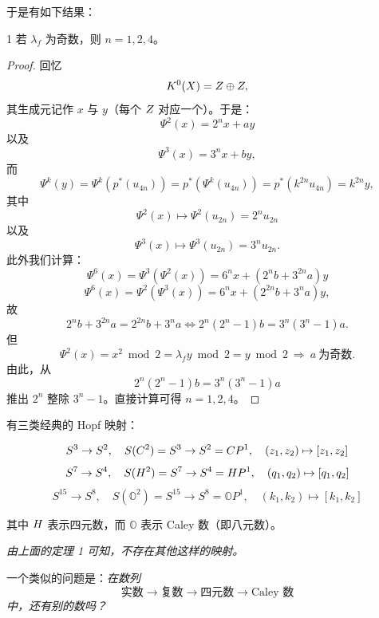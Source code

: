 
于是有如下结果：

\begin{thm}{1} 若 $\lambda_f$ 为奇数，则 $n=1,2,4$。 \end{thm}

\begin{proof}
回忆
\[  K^0(X)=Z\oplus Z, \]
其生成元记作 $x$ 与 $y$（每个 $Z$ 对应一个）。于是：
\[ \Psi^2(x)=2^n x+ay \]
以及
\[ \Psi^3(x)=3^n x+by, \]
而
\[ \Psi^k(y)=\Psi^k(p^*(u_{4n}))=p^*(\Psi^k(u_{4n}))=p^*(k^{2n}u_{4n})=k^{2n}y, \]
其中
\[ \Psi^2(x)\mapsto\Psi^2(u_{2n})=2^n u_{2n} \]
以及
\[ \Psi^3(x)\mapsto\Psi^3(u_{2n})=3^n u_{2n}. \]
此外我们计算：
\[ \Psi^6(x)=\Psi^3(\Psi^2(x))=6^n x+(2^n b+3^{2n}a)y \]
\[ \Psi^6(x)=\Psi^2(\Psi^3(x))=6^n x+(2^{2n}b+3^n a)y, \]
故
\[ 2^n b+3^{2n}a=2^{2n}b+3^n a\iff 2^n(2^n-1)b=3^n(3^n-1)a. \]
但
\[ \Psi^2(x)=x^2\bmod 2=\lambda_f y\bmod 2=y\bmod 2\ \Rightarrow\ a\ \text{为奇数}. \]
由此，从
\[ 2^n(2^n-1)b=3^n(3^n-1)a \]
推出 $2^n$ 整除 $3^n-1$。直接计算可得 $n=1,2,4$。
\end{proof}

有三类经典的 Hopf 映射：


\[ S^3\to S^2,\quad S(C^2)=S^3\to S^2=C P^1,\quad (z_1,z_2)\mapsto[z_1,z_2] \]
\[ S^7\to S^4,\quad S(H^2)=S^7\to S^4=H P^1,\quad (q_1,q_2)\mapsto[q_1,q_2] \]
\[ S^{15}\to S^8,\quad S(\mathbb{O}^2)=S^{15}\to S^8=\mathbb{O}P^1,\quad (k_1,k_2)\mapsto[k_1,k_2] \]

其中 $H$ 表示四元数，而 $\mathbb{O}$ 表示 Caley 数（即八元数）。

\emph{由上面的定理 1 可知，不存在其他这样的映射。}

一个类似的问题是：\emph{在数列}
\[ \text{实数}\to\text{复数}\to\text{四元数}\to\text{Caley 数} \]
\emph{中，还有别的数吗？}


